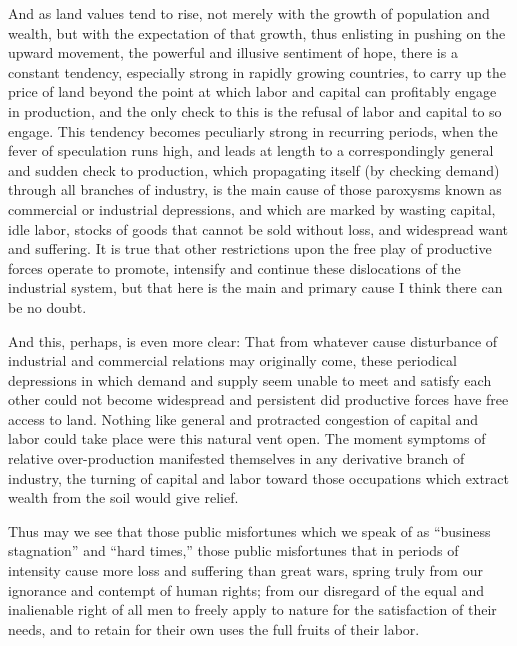 \documentclass{book}
\begin{document}
And as land values tend to rise, not merely with the growth of population and wealth, but with the expectation of that growth, thus enlisting in pushing on the upward movement, the powerful and illusive sentiment of hope, there is a constant tendency, especially strong in rapidly growing countries, to carry up the price of land beyond the point at which labor and capital can profitably engage in production, and the only check to this is the refusal of labor and capital to so engage. This tendency becomes peculiarly strong in recurring periods, when the fever of speculation runs high, and leads at length to a correspondingly general and sudden check to production, which propagating itself (by checking demand) through all branches of industry, is the main cause of those paroxysms known as commercial or industrial depressions, and which are marked by wasting capital, idle labor, stocks of goods that cannot be sold without loss, and widespread want and suffering. It is true that other restrictions upon the free play of productive forces operate to promote, intensify and continue these dislocations of the industrial system, but that here is the main and primary cause I think there can be no doubt.

And this, perhaps, is even more clear: That from whatever cause disturbance of industrial and commercial relations may originally come, these periodical depressions in which demand and supply seem unable to meet and satisfy each other could not become widespread and persistent did productive forces have free access to land. Nothing like general and protracted congestion of capital and labor could take place were this natural vent open. The moment symptoms of relative over-production manifested themselves in any derivative branch of industry, the turning of capital and labor toward those occupations which extract wealth from the soil would give relief.

Thus may we see that those public misfortunes which we speak of as “business stagnation” and “hard times,” those public misfortunes that in periods of intensity cause more loss and suffering than great wars, spring truly from our ignorance and contempt of human rights; from our disregard of the equal and inalienable right of all men to freely apply to nature for the satisfaction of their needs, and to retain for their own uses the full fruits of their labor.
\end{document}

